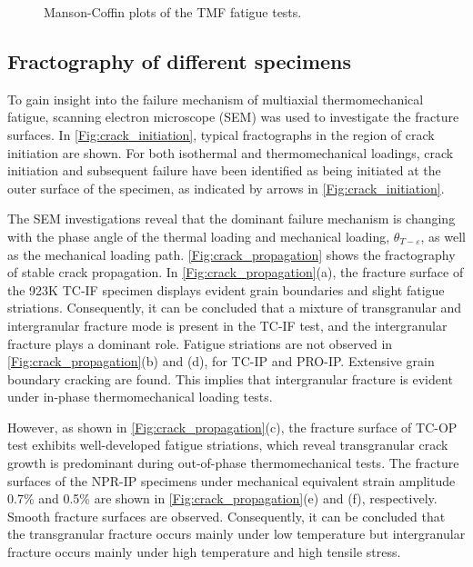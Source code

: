 \begin{figure}[!htp]
  \caption{Manson-Coffin plots of the TMF fatigue tests.}
  \label{Fig:plot_exp_fatigue_life}
\end{figure}

\subsection{Fractography of different specimens}
\noindent
To gain insight into the failure mechanism of multiaxial thermomechanical fatigue, scanning electron microscope (SEM) was used to investigate the fracture surfaces. In \ref{Fig:crack_initiation}, typical fractographs in the region of crack initiation are shown. For both isothermal and thermomechanical loadings, crack initiation and subsequent failure have been identified as being initiated at the outer surface of the specimen, as indicated by arrows in \ref{Fig:crack_initiation}.

The SEM investigations reveal that the dominant failure mechanism is changing with the phase angle of the thermal loading and mechanical loading, $\theta_{T-\varepsilon}$, as well as the mechanical loading path.
\ref{Fig:crack_propagation} shows the fractography of stable crack propagation.
In \ref{Fig:crack_propagation}(a), the fracture surface of the 923K TC-IF specimen displays evident grain boundaries and slight fatigue striations. Consequently, it can be concluded that a mixture of transgranular and intergranular fracture mode is present in the TC-IF test, and the intergranular fracture plays a dominant role.
Fatigue striations are not observed in \ref{Fig:crack_propagation}(b) and (d), for TC-IP and PRO-IP. Extensive grain boundary cracking are found. This implies that intergranular fracture is evident under in-phase thermomechanical loading tests.

However, as shown in \ref{Fig:crack_propagation}(c), the fracture surface of TC-OP test exhibits well-developed fatigue striations, which reveal transgranular crack growth is predominant during out-of-phase thermomechanical tests.
The fracture surfaces of the NPR-IP specimens under mechanical equivalent strain amplitude 0.7\% and 0.5\% are shown in \ref{Fig:crack_propagation}(e) and (f), respectively. Smooth fracture surfaces are observed.
Consequently, it can be concluded that the transgranular fracture occurs mainly under low temperature but intergranular fracture occurs mainly under high temperature and high tensile stress.

